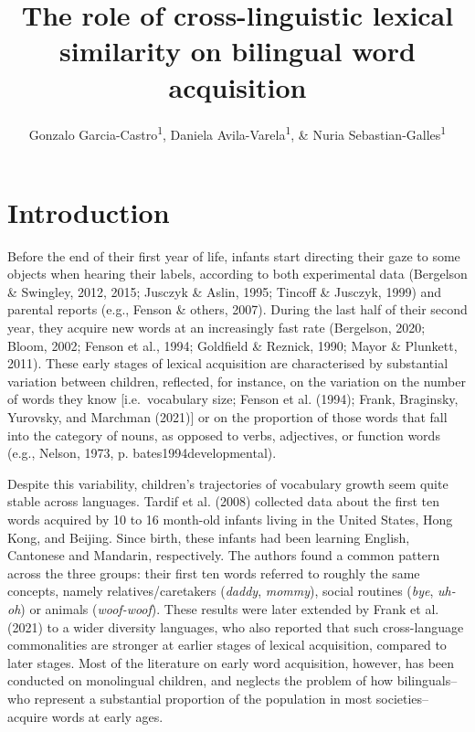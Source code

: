 \documentclass[
  english,
  man,man,floatsintext]{apa6}
\title{The role of cross-linguistic lexical similarity on bilingual word acquisition}
\author{Gonzalo Garcia-Castro\textsuperscript{1}, Daniela Avila-Varela\textsuperscript{1}, \& Nuria Sebastian-Galles\textsuperscript{1}}
\date{}
\affiliation{\vspace{0.5cm}\textsuperscript{1} Center for Brain and Cognition, Universitat Pompeu Fabra, Barcelona, Spain}
\begin{document}
\maketitle

\hypertarget{introduction}{%
\section{Introduction}\label{introduction}}

Before the end of their first year of life, infants start directing their gaze to some objects when hearing their labels, according to both experimental data (Bergelson \& Swingley, 2012, 2015; Jusczyk \& Aslin, 1995; Tincoff \& Jusczyk, 1999) and parental reports (e.g., Fenson \& others, 2007). During the last half of their second year, they acquire new words at an increasingly fast rate (Bergelson, 2020; Bloom, 2002; Fenson et al., 1994; Goldfield \& Reznick, 1990; Mayor \& Plunkett, 2011). These early stages of lexical acquisition are characterised by substantial variation between children, reflected, for instance, on the variation on the number of words they know {[}i.e.~vocabulary size; Fenson et al. (1994); Frank, Braginsky, Yurovsky, and Marchman (2021){]} or on the proportion of those words that fall into the category of nouns, as opposed to verbs, adjectives, or function words (e.g., Nelson, 1973, p. bates1994developmental).

Despite this variability, children's trajectories of vocabulary growth seem quite stable across languages. Tardif et al. (2008) collected data about the first ten words acquired by 10 to 16 month-old infants living in the United States, Hong Kong, and Beijing. Since birth, these infants had been learning English, Cantonese and Mandarin, respectively. The authors found a common pattern across the three groups: their first ten words referred to roughly the same concepts, namely relatives/caretakers (\emph{daddy}, \emph{mommy}), social routines (\emph{bye}, \emph{uh-oh}) or animals (\emph{woof-woof}). These results were later extended by Frank et al. (2021) to a wider diversity languages, who also reported that such cross-language commonalities are stronger at earlier stages of lexical acquisition, compared to later stages. Most of the literature on early word acquisition, however, has been conducted on monolingual children, and neglects the problem of how bilinguals--who represent a substantial proportion of the population in most societies--acquire words at early ages.
\end{document}
